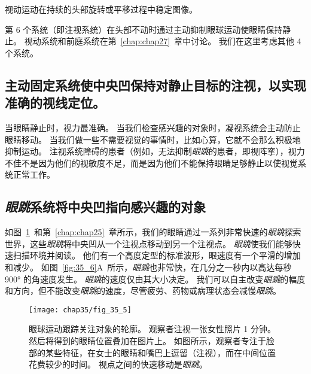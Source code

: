 视动运动在持续的头部旋转或平移过程中稳定图像。


第 6 个系统（即注视系统）在头部不动时通过主动抑制眼球运动使眼睛保持静止。
视动系统和前庭系统在第~\ref{chap:chap27}~章中讨论。
我们在这里考虑其他 4 个系统。



\subsection{主动固定系统使中央凹保持对静止目标的注视，以实现准确的视线定位。}

当眼睛静止时，视力最准确。
当我们检查感兴趣的对象时，凝视系统会主动防止眼睛移动。
当我们做一些不需要视觉的事情时，比如心算，它就不会那么积极地抑制运动。
注视系统障碍的患者（例如，无法抑制\textit{眼跳}的患者，即视阵挛），视力不佳不是因为他们的视敏度不足，而是因为他们不能保持眼睛足够静止以使视觉系统正常工作。



\subsection{\textit{眼跳}系统将中央凹指向感兴趣的对象}

如图~\ref{fig:35_5}~和第~\ref{chap:chap25}~章所示，我们的眼睛通过一系列非常快速的\textit{眼跳}探索世界，这些\textit{眼跳}将中央凹从一个注视点移动到另一个注视点。
\textit{眼跳}使我们能够快速扫描环境并阅读。 
他们有一个高度定型的标准波形，眼速度有一个平滑的增加和减少。
如图~\ref{fig:35_6}A~所示，\textit{眼跳}也非常快，在几分之一秒内以高达每秒 900° 的角速度发生。
\textit{眼跳}的速度仅由其大小决定。
我们可以自主改变\textit{眼跳}的幅度和方向，但不能改变\textit{眼跳}的速度，尽管疲劳、药物或病理状态会减慢\textit{眼跳}。


\begin{figure}[htbp]
	\centering
	\texttt{[image: chap35/fig\_35\_5]}
	\caption{眼球运动跟踪关注对象的轮廓。
		观察者注视一张女性照片 1 分钟。
		然后将得到的眼睛位置叠加在图片上。
		如图所示，观察者专注于脸部的某些特征，在女士的眼睛和嘴巴上逗留（注视），而在中间位置花费较少的时间。
		视点之间的快速移动是\textit{眼跳}\cite{yarbus2013eye}。}
	\label{fig:35_5}
\end{figure}


